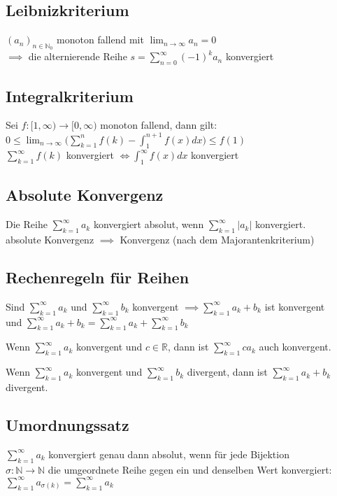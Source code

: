 \documentclass[a4paper,9pt]{extarticle}
\newcommand{\liminfty}[1][n]{\lim_{#1 \to \infty}}
\newcommand{\suminfty}[1][k = 1]{\sum_{#1}^{\infty}}
\begin{document}
	\subsection*{Leibnizkriterium}

	$(a_n)_{n \in \mathbb{N}_0}$ monoton fallend mit $\liminfty{a_n} = 0$ \\
	$\implies$ die alternierende Reihe $s = \suminfty[n = 0]{(-1)^k a_n}$ konvergiert
	
	\subsection*{Integralkriterium}
	Sei $f : [1,∞) → [0,∞)$ monoton fallend, dann gilt: \\
	$0 ≤ \liminfty {} \Big(\sum_{k = 1}^n f(k) - \int_1^{n + 1} f(x) dx\Big) ≤ f(1)$ \\
	$\suminfty f(k)$ konvergiert $\iff \int_1^∞ f(x) dx$ konvergiert 
	

	\subsection*{Absolute Konvergenz}

	Die Reihe $\suminfty{a_k}$ konvergiert absolut, wenn $\suminfty{|a_k|}$ konvergiert. \\
	absolute Konvergenz $\implies$ Konvergenz (nach dem Majorantenkriterium)

	\subsection*{Rechenregeln für Reihen}

	Sind $\suminfty{a_k}$ und $\suminfty{b_k}$ konvergent $\implies \suminfty{a_k + b_k}$ ist konvergent \\
	und	$\suminfty{a_k + b_k} = \suminfty{a_k} + \suminfty{b_k}$

	Wenn $\suminfty{a_k}$ konvergent und $c \in \mathbb{R}$, dann ist $\suminfty{c a_k}$ auch konvergent.

	Wenn $\suminfty{a_k}$ konvergent und $\suminfty{b_k}$ divergent, dann ist $\suminfty{a_k + b_k}$ divergent.

	\subsection*{Umordnungssatz}

	$\suminfty{a_k}$ konvergiert genau dann absolut, wenn für jede Bijektion \\$\sigma: \mathbb{N} \to \mathbb{N}$
	die umgeordnete Reihe gegen ein und denselben Wert konvergiert: 
	$\suminfty{a_{\sigma(k)}} = \suminfty{a_k}$
\end{document}
